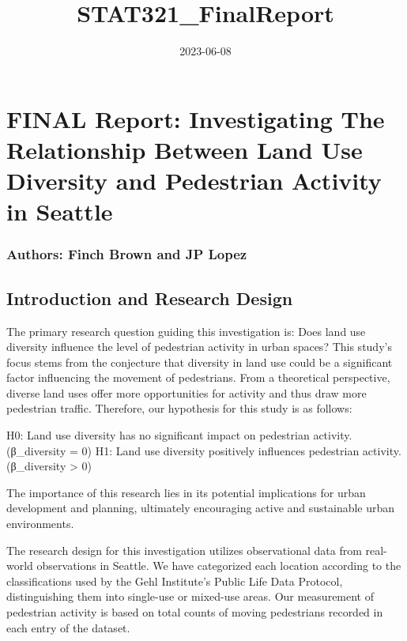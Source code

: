 \documentclass[
]{article}
\title{STAT321\_FinalReport}
\author{}
\date{\vspace{-2.5em}2023-06-08}
\begin{document}
\maketitle

\hypertarget{final-report-investigating-the-relationship-between-land-use-diversity-and-pedestrian-activity-in-seattle}{%
\section{FINAL Report: Investigating The Relationship Between Land Use
Diversity and Pedestrian Activity in
Seattle}\label{final-report-investigating-the-relationship-between-land-use-diversity-and-pedestrian-activity-in-seattle}}

\hypertarget{authors-finch-brown-and-jp-lopez}{%
\subsubsection{Authors: Finch Brown and JP
Lopez}\label{authors-finch-brown-and-jp-lopez}}

\hypertarget{introduction-and-research-design}{%
\subsection{Introduction and Research
Design}\label{introduction-and-research-design}}

The primary research question guiding this investigation is: Does land
use diversity influence the level of pedestrian activity in urban
spaces? This study's focus stems from the conjecture that diversity in
land use could be a significant factor influencing the movement of
pedestrians. From a theoretical perspective, diverse land uses offer
more opportunities for activity and thus draw more pedestrian traffic.
Therefore, our hypothesis for this study is as follows:

H0: Land use diversity has no significant impact on pedestrian activity.
(β\_diversity = 0) H1: Land use diversity positively influences
pedestrian activity. (β\_diversity \textgreater{} 0)

The importance of this research lies in its potential implications for
urban development and planning, ultimately encouraging active and
sustainable urban environments.

The research design for this investigation utilizes observational data
from real-world observations in Seattle. We have categorized each
location according to the classifications used by the Gehl Institute's
Public Life Data Protocol, distinguishing them into single-use or
mixed-use areas. Our measurement of pedestrian activity is based on
total counts of moving pedestrians recorded in each entry of the
dataset.
\end{document}

